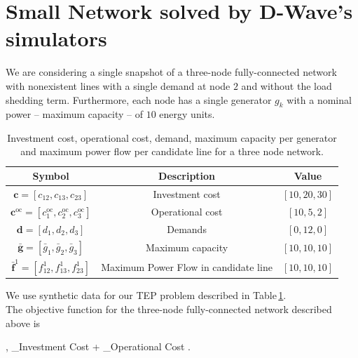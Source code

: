 \section{Small Network solved by D-Wave's simulators}
 We are considering a single snapshot of a three-node fully-connected network with nonexistent lines with a single demand at node $2$ and without the load shedding term. Furthermore, each node has a single generator $g_{k}$ with a nominal power -- maximum capacity -- of $10$ energy units.
 \begin{table}[H]
\centering
\begin{tabular}{ |c |c| c| }
  \hline			
  \textbf{Symbol} & \textbf{Description} & \textbf{Value}  \\
    \hline		
   $\mathbf{c} = \left[c_{12},c_{13},c_{23}\right]$ & Investment cost & $\left[10, 20, 30\right]$\\
       \hline		
   $\mathbf{c}^{\textrm{oc}} = \left[c_{1}^{\textrm{oc}},c_{2}^{\textrm{oc}}, c_{3}^{\textrm{oc}}\right]$ & Operational cost & $\left[10, 5, 2\right]$\\
          \hline		
   $\mathbf{d} = \left[d_{1}, d_{2}, d_{3}\right]$ & Demands & $\left[0, 12, 0\right]$\\
       \hline		
   $\mathbf{\bar{g}} = \left[\bar{g}_{1},\bar{g}_{2},\bar{g}_{3}\right]$ & Maximum capacity & $\left[10, 10, 10\right]$\\
    \hline	
    $\mathbf{\bar{f}}^{1} = \left[f_{12}^{1},f_{13}^{1},f_{23}^{1}\right]$ & Maximum Power Flow in candidate line & $\left[10, 10, 10\right]$\\
    \hline
\end{tabular}
\caption{Investment cost, operational cost, demand, maximum capacity per generator and maximum power flow per candidate line for a three node network.}
\label{tab:SmallNetwork}
\end{table}
We use synthetic data for our TEP problem described in Table\,\ref{tab:SmallNetwork}.\\
The objective function for the three-node fully-connected network described above is
\begin{mini!}[2]
	{, }{_{\textrm{Investment Cost}} + _{\textrm{Operational Cost}}}{}{}{}
    .
    \end{mini!}
